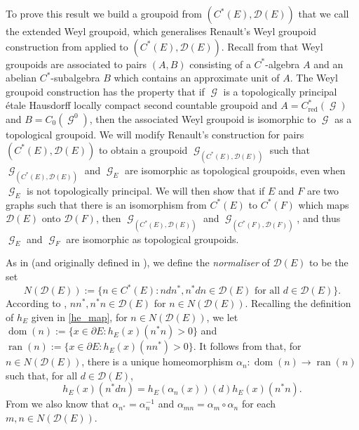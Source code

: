 \documentclass[12pt, a4paper]{amsart}
\numberwithin{equation}{section}
\theoremstyle{definition}
\theoremstyle{remark}
\begin{document}
To prove this result we build a groupoid from $(C^*(E),{\mathcal{D}}(E))$ that we call the 
extended Weyl groupoid, which generalises Renault's Weyl groupoid construction 
from \cite{Ren2} applied to $(C^*(E),{\mathcal{D}}(E))$. Recall from \cite{Ren2} that 
Weyl groupoids are associated to pairs $(A,B)$ consisting of a $C^*$-algebra 
$A$ and an abelian $C^*$-subalgebra $B$ which contains an approximate unit of 
$A$. The Weyl groupoid construction has the property that if ${\operatorname{\mathcal{G}}}$ is a 
topologically principal \'etale Hausdorff locally compact second countable 
groupoid and $A=C^*_{\operatorname{red}}({\operatorname{\mathcal{G}}})$ and $B=C_0({\operatorname{\mathcal{G}}}^0)$, then the 
associated Weyl groupoid is isomorphic to ${\operatorname{\mathcal{G}}}$ as a topological groupoid. We 
will modify Renault's construction for pairs $(C^*(E),\mathcal{D}(E))$ to 
obtain a groupoid ${\operatorname{\mathcal{G}}}_{(C^*(E),\mathcal{D}(E))}$ such that ${\operatorname{\mathcal{G}}}_{(C^*(E),\mathcal{D}(E))}$ and ${\operatorname{\mathcal{G}}}_E$ are isomorphic as topological groupoids, even when ${\operatorname{\mathcal{G}}}_E$ is not topologically 
principal. We will then show that if $E$ and $F$ are two graphs such that 
there is an isomorphism from $C^*(E)$ to $C^*(F)$ which maps $\mathcal{D}(E)$ 
onto $\mathcal{D}(F)$, then ${\operatorname{\mathcal{G}}}_{(C^*(E),\mathcal{D}(E))}$ and 
${\operatorname{\mathcal{G}}}_{(C^*(F),\mathcal{D}(F))}$, and thus ${\operatorname{\mathcal{G}}}_E$ and ${\operatorname{\mathcal{G}}}_F$ are 
isomorphic as topological groupoids.

As in \cite{Ren2} (and originally defined in \cite{Kum2}), we define the 
\emph{normaliser} of $\mathcal{D}(E)$ to be the set
\begin{equation*}
	N(\mathcal{D}(E)):=\{n\in C^*(E): ndn^*, n^*dn\in\mathcal{D}(E)\text{ for 
	all }d\in\mathcal{D}(E)\}.
\end{equation*} 
According to \cite[Lemma 4.6]{Ren2}, $nn^*,n^*n\in\mathcal{D}(E)$ for $n\in 
N(\mathcal{D}(E))$. Recalling the definition of $h_E$ given in \eqref{he_map}, 
for $n\in N(\mathcal{D}(E))$, we let ${{\operatorname{dom}}}(n):=\{x\in\partial 
E:h_E(x)(n^*n)>0\}$ and ${{\operatorname{ran}}}(n):=\{x\in\partial E:h_E(x)(nn^*)>0\}$. It 
follows from \cite[Proposition 4.7]{Ren2} that, for $n\in N(\mathcal{D}(E))$, 
there is a unique homeomorphism $\alpha_n:{{\operatorname{dom}}}(n)\to{{\operatorname{ran}}}(n)$ such that, for 
all $d\in\mathcal{D}(E)$,
\begin{equation}\label{eq: defining prop of alphas}
	h_E(x)(n^*dn)=h_E(\alpha_n(x))(d)h_E(x)(n^*n).
\end{equation}
From \cite[Lemma~4.10]{Ren2} we also know that $\alpha_{n^*}=\alpha_n^{-1}$ 
and $\alpha_{mn}=\alpha_m\circ\alpha_n$ for each $m,n\in N({\mathcal{D}}(E))$. 
\end{document}
